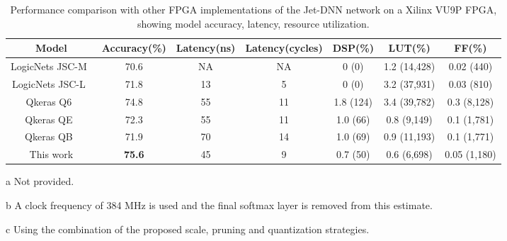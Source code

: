 \begin{table*}[t]
\centering


\caption{Performance comparison with other FPGA implementations of the Jet-DNN network on a Xilinx VU9P FPGA, showing model accuracy, latency, resource utilization. }
\label{table:cmp_fpga}

\begin{threeparttable}
\centering
\begin{tabular}{c| c | c |c|c | c |c }
\toprule
 
Model & Accuracy(\%) & Latency(ns) & Latency(cycles) & DSP(\%) & LUT(\%) & FF(\%)   \\

\midrule

LogicNets JSC-M~\cite{umuroglu2020logicnets} & 70.6 & NA\tnote{a} & NA & 0 (0) & 1.2 (14,428) & 0.02 (440)  \\
\midrule
LogicNets JSC-L~\cite{umuroglu2020logicnets} & 71.8 & 13\tnote{b} & 5 & 0 (0) & 3.2 (37,931) & 0.03 (810)  \\
\midrule
Qkeras Q6~\cite{coelho2021automatic} & 74.8 & 55 & 11 & 1.8 (124) & 3.4 (39,782) & 0.3 (8,128)  \\
\midrule
Qkeras QE~\cite{coelho2021automatic} & 72.3 & 55 & 11 & 1.0 (66) & 0.8 (9,149) & 0.1 (1,781)  \\
\midrule
Qkeras QB~\cite{coelho2021automatic} & 71.9 & 70 & 14 & 1.0 (69) & 0.9 (11,193) & 0.1 (1,771)  \\
\midrule
\midrule
This work\tnote{c} & \textbf{75.6} & 45 & 9 & 0.7 (50) & 0.6 (6,698) & 0.05 (1,180)  \\

\bottomrule
\end{tabular}
   \begin{tablenotes}
    \footnotesize
     \item[a] Not provided.  
     \item[b] A clock frequency of 384 MHz is used and the final softmax layer is removed from this estimate. 
     \item[c] Using the combination of the proposed scale, pruning and quantization strategies. 
     

    \normalsize
   \end{tablenotes}
\end{threeparttable}
\end{table*}